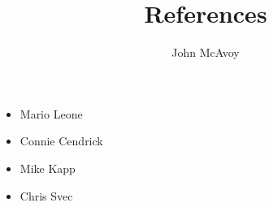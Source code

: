 \documentclass{article}
\title{References}
\author{John McAvoy}
\date{}
\begin{document}
\maketitle
\begin{itemize}
  \item Mario Leone
  \item Connie Cendrick
  \item Mike Kapp
  \item Chris Svec
\end{itemize}
\end{document}
